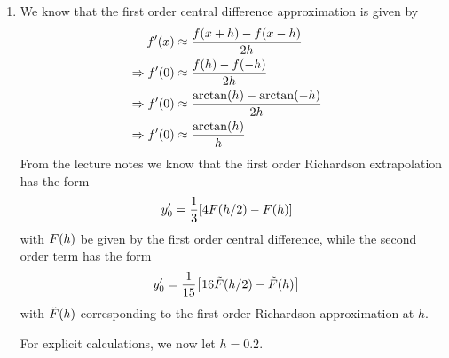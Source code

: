 \documentclass[12pt]{article}
\DeclarePairedDelimiter\rb{(}{)}
\DeclarePairedDelimiter\sqrb{[}{]}
\begin{document}
\begin{enumerate}[label=(\alph*)]
	\item 
		We know that the first order central difference approximation is given by 
        \begin{align*}
            f'\rb*{x}  & \approx \frac{f \rb*{x + h} - f \rb*{x - h}}{2h} &\\
            \Rightarrow f' \rb*{0} & \approx \frac{f \rb*{h} - f \rb*{ -h}}{2h} &\\
            \Rightarrow f' \rb*{0} & \approx \frac{\arctan\rb*{h} - \arctan \rb*{-h}  }{2h} &\\
            \Rightarrow f' \rb*{0} & \approx \frac{\arctan \rb*{h} }{h} &\\
        \end{align*}
        From the lecture notes we know that the first order Richardson extrapolation has the form
        \begin{align*}
            y_{0}' & = \frac{1}{3} \sqrb*{ 4 F \rb*{h/2} - F \rb*{h}} &\\
        \end{align*}
        with \(F\rb*{h}\) be given by the first order central difference, 
        while the second order term has the form
        \begin{align*}
            y_{0}' & =  \frac{1}{15} \sqrb*{16 \tilde{F} \rb*{ h/2} - \tilde{F} \rb*{h}} &\\
        \end{align*}
        with \(\tilde{F} \rb*{h}\) corresponding to the first order Richardson approximation at \(h\).

        For explicit calculations, we now let \(h = 0.2\).


\end{enumerate}
\end{document}

